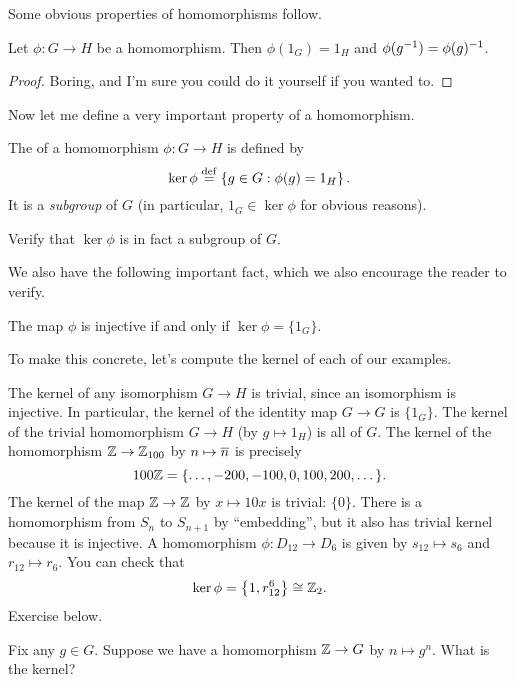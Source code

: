 Some obvious properties of homomorphisms follow.
\begin{fact}
	Let $\phi : G \to H$ be a homomorphism.
	Then $\phi(1_G) = 1_H$ and $\phi(g^{-1}) = \phi(g)^{-1}$.
\end{fact}
\begin{proof}
	Boring, and I'm sure you could do it yourself if you wanted to.
\end{proof}

Now let me define a very important property of a homomorphism.
\begin{definition}
	The  of a homomorphism $\phi : G \to H$ is defined by
	\[ \ker \phi 
	\overset{\mathrm{def}}{=}
		\left\{ g \in G : \phi(g) = 1_H \right\}.
		\]
	It is a \emph{subgroup} of $G$ (in particular, $1_G \in \ker \phi$ for obvious reasons).
\end{definition}
\begin{ques}
	Verify that $\ker\phi$ is in fact a subgroup of $G$.
\end{ques}
We also have the following important fact, which we also encourage the reader to verify.
\begin{proposition}
	The map $\phi$ is injective if and only if $\ker\phi = \{1_G\}$.
\end{proposition}

To make this concrete, let's compute the kernel of each of our examples.
\begin{example}
	\listhack
	\begin{enumerate}[(a)]
		\ii The kernel of any isomorphism $G \to H$ is trivial,
		since an isomorphism is injective.
		In particular, the kernel of the identity map $G \to G$ is $\{1_G\}$.
		\ii The kernel of the trivial homomorphism $G \to H$ (by $g \mapsto 1_H$) is all of $G$.
		\ii The kernel of the homomorphism $\mathbb Z \to \mathbb Z_{100}$ by $n \mapsto \overline n$
		is precisely \[ 100\mathbb Z = \{\dots, -200, -100, 0, 100, 200, \dots \}. \]
		\ii The kernel of the map $\mathbb Z \to \mathbb Z$ by $x \mapsto 10x$ is trivial: $\{0\}$.
		\ii There is a homomorphism from $S_n$ to $S_{n+1}$ by ``embedding'',
		but it also has trivial kernel because it is injective.
		\ii A homomorphism $\phi: D_{12} \to D_6$ is given by $s_{12} \mapsto s_6$ and $r_{12} \mapsto r_6$.  
		You can check that
		\[ \ker \phi = \left\{ 1, r_{12}^{6} \right\} \cong \mathbb Z_{2}. \]
		\ii Exercise below.
	\end{enumerate}
\end{example}
\begin{exercise}
	Fix any $g \in G$.
	Suppose we have a homomorphism $\mathbb Z \to G$ by $n \mapsto g^n$.
	What is the kernel?
\end{exercise}

